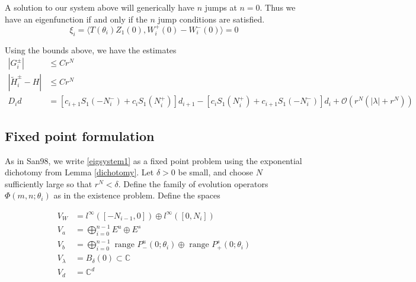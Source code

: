 \documentclass[12pt]{article}
\def\C{{\mathbb C}}
\begin{document}
A solution to our system above will generically have $n$ jumps at $n = 0$. Thus we have an eigenfunction if and only if the $n$ jump conditions are satisfied.
\begin{equation}\label{jumpcond}
\xi_i = \langle T(\theta_i) Z_1(0), W_i^+(0) - W_i^-(0) \rangle = 0
\end{equation}

Using the bounds above, we have the estimates
\begin{align*}
|G_i^\pm| &\leq C r^N \\
|\tilde{H}_i^\pm - H| &\leq C r^N \\
D_i d &= [ c_{i+1} S_1(-N_i^-) + c_i S_1(N_i^+) ] d_{i+1}
- [ c_i S_1(N_i^+) + c_{i+1} S_1(-N_i^-) ] d_i 
+\mathcal{O}(r^N( |\lambda| + r^N))
\end{align*}

\subsection{Fixed point formulation}
As in San98, we write \eqref{eigsystem1} as a fixed point problem using the exponential dichotomy from Lemma \ref{dichotomy}. Let $\delta > 0$ be small, and choose $N$ sufficiently large so that $r^N < \delta$. Define the family of evolution operators $\Phi(m, n; \theta_i)$ as in the existence problem. Define the spaces

\begin{align*}
V_W &= l^\infty([-N_{i-1}, 0]) \oplus l^\infty([0, N_i])  \\
V_a &= \bigoplus_{i=0}^{n-1} E^u \oplus E^s \\
V_b &= \bigoplus_{i=0}^{n-1} 
\text{ range } P_-^u(0; \theta_i) \oplus \text{ range } P_+^s(0; \theta_i)\\
V_\lambda &= B_\delta(0) \subset \C \\
V_d &= \C^d
\end{align*}
\end{document}
